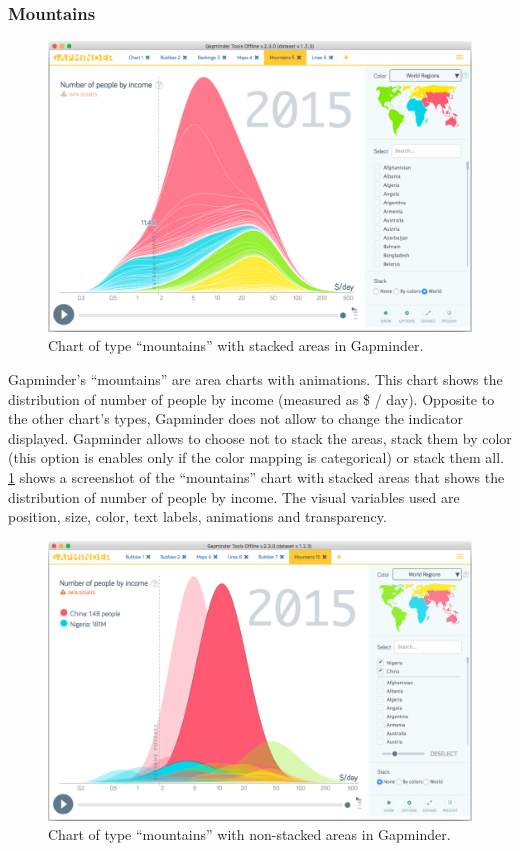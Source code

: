 \subsubsection{Mountains}
\label{subsubsec:mountains}
\begin{figure}[h]
	\centering
	\includegraphics[width=0.95\columnwidth]{figures/mountains}
	\caption{Chart of type ``mountains'' with stacked areas in Gapminder.}
	\label{fig:mountains}
\end{figure}

Gapminder's ``mountains'' are area charts with animations.
This chart shows the distribution of number of people by income (measured as \$ / day).
Opposite to the other chart's types, Gapminder does not allow to change the indicator displayed.
Gapminder allows to choose not to stack the areas, stack them by color (this option is enables only if the color mapping is categorical) or stack them all.
\cref{fig:mountains} shows a screenshot of the ``mountains'' chart with stacked areas that shows the distribution of number of people by income.
The visual variables used are position, size, color, text labels, animations and transparency.

\begin{figure}[h]
	\centering
	\includegraphics[width=0.95\columnwidth]{figures/mountains-non-stacked}
	\caption{Chart of type ``mountains'' with non-stacked areas in Gapminder.}
	\label{fig:mountains-non-stacked}
\end{figure}

